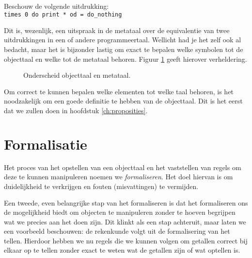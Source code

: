 \begin{example}\mbox{}\\
Beschouw de volgende uitdrukking:\\
  \texttt{times 0 do print * od = do\_nothing}
\end{example}
Dit is, wezenlijk, een uitspraak in de metataal over de equivalentie van twee uitdrukkingen in een of andere programmeertaal. Wellicht had je het zelf ook al bedacht, maar het is bijzonder lastig om exact te bepalen welke symbolen tot de objecttaal en welke tot de metataal behoren. Figuur \ref{fig:metataal} geeft hierover verheldering.

\begin{figure}[ht]
\begin{center}
\caption{Onderscheid objecttaal en metataal.}\label{fig:metataal}
\end{center}
\end{figure}

Om correct te kunnen bepalen welke elementen tot welke taal behoren, is het noodzakelijk om een goede definitie te hebben van de objecttaal. Dit is het eerst dat we zullen doen in hoofdstuk \ref{ch:proposities}.

\section{Formalisatie}
Het proces van het opstellen van een objecttaal en het vaststellen van regels om deze te kunnen manipuleren noemen we \emph{formaliseren}. Het doel hiervan is om duidelijkheid te verkrijgen en fouten (misvattingen) te vermijden.

Een tweede, even belangrijke stap van het formaliseren is dat het formaliseren ons de mogelijkheid biedt om objecten te manipuleren zonder te hoeven begrijpen wat we precies aan het doen zijn. Dit klinkt als een stap achteruit, maar laten we een voorbeeld beschouwen: de rekenkunde volgt uit de formalisering van het tellen. Hierdoor hebben we nu regels die we kunnen volgen om getallen correct bij elkaar op te tellen zonder exact te weten wat de getallen zijn of wat optellen is.

